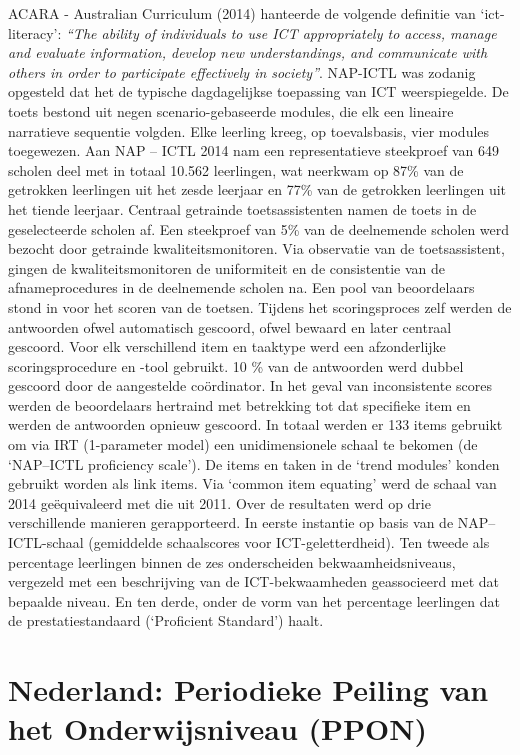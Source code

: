 \documentclass[
  letterpaper,
]{report}
\begin{document}
ACARA - Australian Curriculum (2014) hanteerde de volgende definitie van
`ict-literacy': \emph{``The ability of individuals to use ICT
appropriately to access, manage and evaluate information, develop new
understandings, and communicate with others in order to participate
effectively in society''}. NAP-ICTL was zodanig opgesteld dat het de
typische dagdagelijkse toepassing van ICT weerspiegelde. De toets
bestond uit negen scenario-gebaseerde modules, die elk een lineaire
narratieve sequentie volgden. Elke leerling kreeg, op toevalsbasis, vier
modules toegewezen. Aan NAP -- ICTL 2014 nam een representatieve
steekproef van 649 scholen deel met in totaal 10.562 leerlingen, wat
neerkwam op 87\% van de getrokken leerlingen uit het zesde leerjaar en
77\% van de getrokken leerlingen uit het tiende leerjaar. Centraal
getrainde toetsassistenten namen de toets in de geselecteerde scholen
af. Een steekproef van 5\% van de deelnemende scholen werd bezocht door
getrainde kwaliteitsmonitoren. Via observatie van de toetsassistent,
gingen de kwaliteitsmonitoren de uniformiteit en de consistentie van de
afnameprocedures in de deelnemende scholen na. Een pool van beoordelaars
stond in voor het scoren van de toetsen. Tijdens het scoringsproces zelf
werden de antwoorden ofwel automatisch gescoord, ofwel bewaard en later
centraal gescoord. Voor elk verschillend item en taaktype werd een
afzonderlijke scoringsprocedure en -tool gebruikt. 10 \% van de
antwoorden werd dubbel gescoord door de aangestelde coördinator. In het
geval van inconsistente scores werden de beoordelaars hertraind met
betrekking tot dat specifieke item en werden de antwoorden opnieuw
gescoord. In totaal werden er 133 items gebruikt om via IRT (1-parameter
model) een unidimensionele schaal te bekomen (de `NAP--ICTL proficiency
scale'). De items en taken in de `trend modules' konden gebruikt worden
als link items. Via `common item equating' werd de schaal van 2014
geëquivaleerd met die uit 2011. Over de resultaten werd op drie
verschillende manieren gerapporteerd. In eerste instantie op basis van
de NAP--ICTL-schaal (gemiddelde schaalscores voor ICT-geletterdheid).
Ten tweede als percentage leerlingen binnen de zes onderscheiden
bekwaamheidsniveaus, vergezeld met een beschrijving van de
ICT-bekwaamheden geassocieerd met dat bepaalde niveau. En ten derde,
onder de vorm van het percentage leerlingen dat de prestatiestandaard
(`Proficient Standard') haalt.

\hypertarget{nederland-periodieke-peiling-van-het-onderwijsniveau-ppon}{%
\section{Nederland: Periodieke Peiling van het Onderwijsniveau
(PPON)}\label{nederland-periodieke-peiling-van-het-onderwijsniveau-ppon}}
\end{document}
